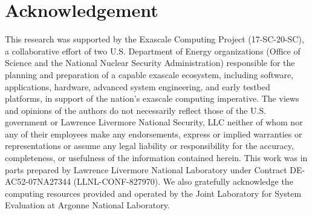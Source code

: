 \documentclass[sigconf,screen]{acmart}
\begin{document}
\maketitle









\section*{Acknowledgement}
This research was supported by the Exascale Computing Project (17-SC-20-SC), a collaborative effort of two U.S. Department of Energy organizations (Office of Science and the National Nuclear Security Administration) responsible for the planning and preparation of a capable exascale ecosystem, including software, applications, hardware, advanced system engineering, and early testbed platforms, in support of the nation's exascale computing imperative.
The views and opinions of the authors do not necessarily reflect those of the U.S. government or Lawrence Livermore National Security, LLC neither of whom nor any of their employees make any endorsements, express or implied warranties or representations or assume any legal liability or responsibility for the accuracy, completeness, or usefulness of the information contained herein.
This work was in parts prepared by Lawrence Livermore National Laboratory under Contract DE-AC52-07NA27344 (LLNL-CONF-827970).
We also gratefully acknowledge the computing resources provided and operated by the Joint Laboratory for System Evaluation at Argonne National Laboratory.




\end{document}
